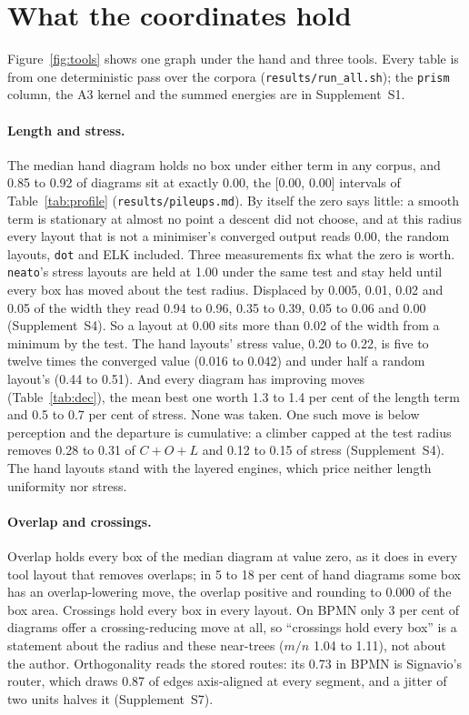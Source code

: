 \documentclass[11pt]{article}
\begin{document}
\section{What the coordinates hold}\label{sec:results}



Figure~\ref{fig:tools} shows one graph under the hand and three tools. Every table is
from one deterministic pass over the corpora (\texttt{results/run\_all.sh}); the
\texttt{prism} column, the A3 kernel and the summed energies are in Supplement~S1.

\paragraph{Length and stress.} The median hand diagram holds no box under either term in
any corpus, and 0.85 to 0.92 of diagrams sit at exactly 0.00, the [0.00, 0.00] intervals
of Table~\ref{tab:profile} (\texttt{results/pileups.md}).
By itself the zero says little: a smooth term is stationary at almost no point a descent
did not choose, and at this radius every layout that is not a minimiser's converged
output reads 0.00, the random layouts, \texttt{dot} and ELK included. Three measurements
fix what the zero is worth. \texttt{neato}'s stress layouts are held at 1.00 under the
same test and stay held until every box has moved about the test radius. Displaced by
0.005, 0.01, 0.02 and 0.05 of the width they read 0.94 to 0.96, 0.35 to 0.39, 0.05 to 0.06
and 0.00 (Supplement~S4). So a layout at 0.00 sits more than 0.02 of the width from a
minimum by the test. The hand layouts' stress value, 0.20 to 0.22, is five to
twelve times the converged value (0.016 to 0.042) and under half a random layout's (0.44
to 0.51). And every diagram has improving moves (Table~\ref{tab:dec}), the mean best one
worth 1.3 to 1.4 per cent of the length term and 0.5 to 0.7 per cent of stress. None was
taken. One such move is below perception and the departure is cumulative: a climber capped
at the test radius removes 0.28 to 0.31 of $C{+}O{+}L$ and 0.12 to 0.15 of stress
(Supplement~S4). The hand layouts stand with the layered engines, which price neither length uniformity
nor stress.

\paragraph{Overlap and crossings.} Overlap holds every box of the median diagram at value
zero, as it does in every tool layout that removes overlaps; in 5 to 18 per cent of hand
diagrams some box has an overlap-lowering move, the overlap positive and rounding to
0.000 of the box area. Crossings hold every box in every layout. On BPMN only 3 per cent
of diagrams offer a crossing-reducing move at all, so ``crossings hold every box'' is
a statement about the radius and these near-trees ($m/n$ 1.04 to 1.11), not about the
author. Orthogonality reads the stored routes:
its 0.73 in BPMN is Signavio's router, which draws 0.87 of edges axis-aligned at every
segment, and a jitter of two units halves it (Supplement~S7).
\end{document}
